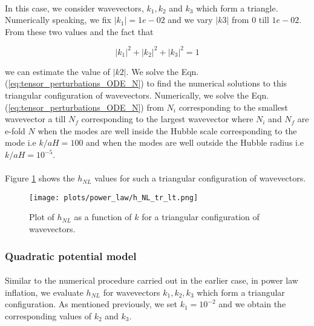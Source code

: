 \documentclass[12pt,a4paper,oneside]{book}
\begin{document}
\paragraph*{} In this case, we consider wavevectors, $k_1, k_2$ and $k_3$ which form 
a triangle. Numerically speaking, we fix $|k_1| = 1e-02$ and we vary 
$|k3|$ from $0$ till $1e-02$. From these two values and the fact that 

\begin{equation}
|k_1|^2+|k_2|^2+|k_3|^2 = 1
\end{equation}

\noindent we can estimate the value of $|k2|$. We solve the Eqn. (\ref{eq:tensor_perturbations_ODE_N}) 
to find the numerical solutions to this triangular configuration of wavevectors. Numerically, we solve 
the Eqn. (\ref{eq:tensor_perturbations_ODE_N}) from $N_i$ corresponding to the smallest wavevector a
till $N_f$ corresponding to the largest wavevector where $N_i$ and $N_f$ are e-fold $N$ 
when the modes are well inside the Hubble scale corresponding to the mode i.e $k/aH = 100$ and
when the modes are well outside the Hubble radius i.e $k/aH = 10^{-5}$.

\paragraph*{} Figure \ref{fig:tr_h_NL_vs_k} shows the $h_{NL}$ values for such a triangular configuration 
of wavevectors.

\begin{figure}
\begin{center}
\texttt{[image: plots/power\_law/h\_NL\_tr\_lt.png]}
\caption[Plot of $h_{NL}$ as a function of $k$ for a triangular configuration of wavevectors in power law inflation.]
{Plot of $h_{NL}$ as a function of $k$ for a triangular configuration of wavevectors.}
\label{fig:tr_h_NL_vs_k}
\end{center}
\end{figure}

\subsubsection{Quadratic potential model}

\paragraph*{} Similar to the numerical procedure carried out in the earlier case, in 
power law inflation, we evaluate $h_{NL}$ for wavevectors $k_1, k_2, k_3$ which form a 
triangular configuration. As mentioned previously, we set $k_1 = 10^{-2}$ and we obtain 
the corresponding values of $k_2$ and $k_3$.
\end{document}
